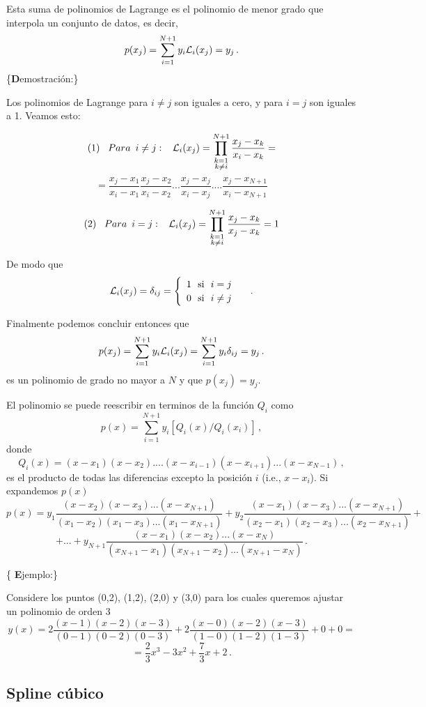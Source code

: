 \documentclass[
]{agujournal2019}
\begin{document}
Esta suma de polinomios de Lagrange es el polinomio de menor grado que
interpola un conjunto de datos, es decir,
\[p(x_j)=\sum^{N+1}_{i=1} y_i {\cal L}_i(x_j)=y_j\,.\]
\{\textbf Demostración:\}

Los polinomios de Lagrange para \(i\ne j\) son iguales a cero, y para
\(i=j\) son iguales a 1. Veamos esto:

\[{ (1)}\,\,\,\,\,{ Para}\,\,\,{i \ne j}:\,\,\,\,\,{\cal L}_i(x_j)=\prod^{N+1}_{\substack{k=1\\ k\ne i}} \frac{x_j-x_k}{x_i-x_k}=\]
\[=\frac{x_j-x_1}{x_i-x_1} \frac{x_j-x_2}{x_i-x_2} ...\frac{x_j-x_j}{x_i-x_j}....\frac{x_j-x_{N+1}}{x_i-x_{N+1}}\]

\[{ (2)}\,\,\,\,\,{ Para}\,\,\,{i = j}:\,\,\,\,\,{\cal L}_i(x_j)=\prod^{N+1}_{\substack{k=1\\ k\ne i}} \frac{x_j-x_k}{x_j-x_k}=1\]

De modo que \[{\cal L}_i(x_j)=\delta_{ij}=\begin{cases}
\begin{array}{c}
   1 \,\,\,\,\text{si}\,\,\,\,i= j\\
   0 \,\,\,\,\text{si}\,\,\,\,i\ne j\\
\end{array}
\end{cases}\,.\]

Finalmente podemos concluir entonces que
\[p(x_j)=\sum^{N+1}_{i=1} y_i {\cal L}_i(x_j)=\sum^{N+1}_{i=1} y_i \delta_{ij}=y_j\,.\]
es un polinomio de grado no mayor a \(N\) y que \(p(x_j)=y_j\).

El polinomio se puede reescribir en terminos de la función \(Q_i\) como
\[p(x)=\sum^{N+1}_{i=1} y_i[Q_i(x)/Q_i(x_i)]\,,\] donde
\[Q_i(x)=(x-x_1)(x-x_2)....(x-x_{i-1})(x-x_{i+1})...(x-x_{N-1})\,,\] es
el producto de todas las diferencias excepto la posición \(i\) (i.e.,
\(x-x_{i}\)). Si expandemos \(p(x)\)
\[p(x)=y_1\frac{(x-x_2)(x-x_3)...(x-x_{N+1})}{(x_1-x_2)(x_1-x_3)...(x_1-x_{N+1})} +
       y_2\frac{(x-x_1)(x-x_3)...(x-x_{N+1})}{(x_2-x_1)(x_2-x_3)...(x_2-x_{N+1})} +\]
\[+...+y_{N+1}\frac{(x-x_1)(x-x_2)...(x-x_{N})}{(x_{N+1}-x_1)(x_{N+1}-x_2)...(x_{N+1}-x_{N})}\,.\]

\{ \textbf Ejemplo:\}

Considere los puntos (0,2), (1,2), (2,0) y (3,0) para los cuales
queremos ajustar un polinomio de orden 3
\[y(x)=2\frac{(x-1)(x-2)(x-3)}{(0-1)(0-2)(0-3)} + 2\frac{(x-0)(x-2)(x-3)}{(1-0)(1-2)(1-3)} + 0
+ 0=\] \[=\frac{2}{3}x^3 -3x^2 +\frac{7}{3}x +2\,.\]

\subsection{Spline cúbico}\label{spline-cuxfabico}
\end{document}
